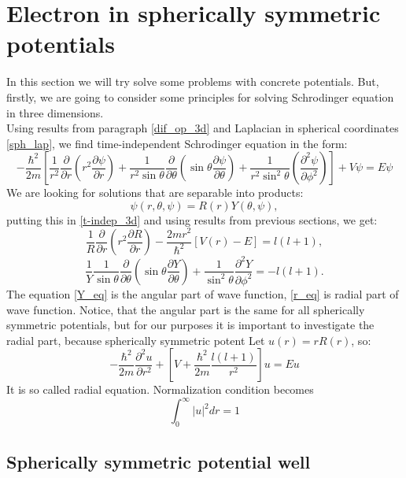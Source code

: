 \documentclass[a4paper, 12pt]{article}
\begin{document}
\section{Electron in spherically symmetric potentials}\label{e_sph_poten}
In this section we will try solve some problems with concrete potentials. But, firstly, we are going to consider some principles for solving  Schrodinger equation in three dimensions.\\
Using results from paragraph \ref{dif_op_3d} and Laplacian in spherical coordinates \eqref{sph_lap},  we find time-independent Schrodinger equation in the form:
\begin{equation}\label{t-indep_3d}
-\frac{\hbar^2}{2m}[\frac{1}{r^2} \frac{\partial}{\partial r}({r^2}\frac{\partial \psi}{\partial r})+\frac{1}{r^2\sin{\theta}}\frac{\partial}{\partial \theta}(\sin{\theta}\frac{\partial \psi}{\partial \theta})+\frac{1}{r^2\sin^2{\theta}}(\frac{\partial^2 \psi}{\partial \phi^2}) ] + V\psi = E \psi
\end{equation}
We are looking for solutions that are separable into products:
$$\psi (r, \theta, \psi) = R(r)Y(\theta, \psi),$$
putting this in \eqref{t-indep_3d} and using results from previous sections, we get:
\begin{equation}\label{r_eq}
	\frac{1}{R}\frac{\partial}{\partial r}(r^2 \frac{\partial R}{\partial r}) - \frac{2m r^2}{\hbar^2}[V(r)-E] = l(l+1),
\end{equation}
\begin{equation}\label{Y_eq}
	\frac{1}{Y}\frac{1}{\sin \theta}\frac{\partial}{\partial \theta}(\sin \theta \frac{\partial Y}{\partial \theta}) + \frac{1}{\sin^2 \theta}\frac{\partial^2 Y}{\partial \phi^2}=-l(l+1).
\end{equation}
The equation \eqref{Y_eq} is the angular part of wave function, \eqref{r_eq} is radial part of wave function. Notice, that  the angular part is the same for all spherically symmetric potentials, but for our purposes it is important to investigate the radial part, because spherically symmetric potent%
Let $u(r) = r R(r)$, so:
\begin{equation}\label{r_eq}
	-\frac{\hbar^2}{2m}\frac{\partial^2 u}{\partial r^2}+[V+\frac{\hbar^2}{2m}\frac{l(l+1)}{r^2}]u = Eu
\end{equation}
It is so called radial equation. Normalization condition becomes
$$\int_{0}^{\infty} |u|^2  dr=1$$

\subsection{Spherically symmetric potential well}
\end{document}

